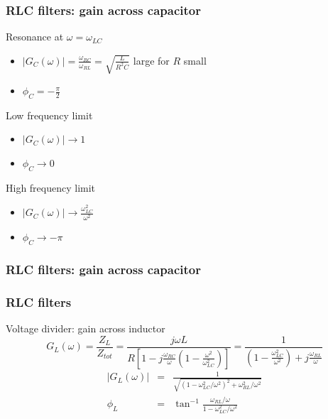 \documentclass[beamer]{standalone}
\begin{document}
\begin{frame}
 \frametitle{RLC filters: gain across capacitor}
 \begin{block}{Resonance at $\omega = \omega_{LC}$}
  \begin{itemize}
   \item $|G_C(\omega)| = \frac{\omega_{RC}}{\omega_{RL}} = \sqrt{\frac{L}{R^2 C}}$ large for $R$ small
   \item $\phi_C = -\frac{\pi}{2}$
  \end{itemize}
 \end{block}
 \begin{block}{Low frequency limit}
  \begin{itemize}
   \item $|G_C(\omega)| \to 1$
   \item $\phi_C \to 0$
  \end{itemize}
 \end{block}
 \begin{block}{High frequency limit}
  \begin{itemize}
   \item $|G_C(\omega)| \to \frac{\omega^2_{LC}}{\omega^2}$
   \item $\phi_C \to -\pi$
  \end{itemize}
 \end{block}
\end{frame}

\begin{frame}
 \frametitle{RLC filters: gain across capacitor}
 \begin{center}
 \end{center}
\end{frame}

\begin{frame}
 \frametitle{RLC filters}
 \begin{block}{Voltage divider: gain across inductor}
  \begin{equation*}
   G_L(\omega) = \frac{Z_L}{Z_{tot}} = \frac{j\omega L}{R\left[ 1 - j\frac{\omega_{RC}}{\omega} \left( 1 - \frac{\omega^2}{\omega_{LC}^2} \right) \right]} = \frac{1}{\left( 1 - \frac{\omega^2_{LC}}{\omega^2} \right) + j\frac{\omega_{RL}}{\omega}}
  \end{equation*}
  \begin{eqnarray*}
   |G_L(\omega)| & = & \frac{1}{\sqrt{ \left(1 - \omega_{LC}^2/\omega^2 \right)^2 + \omega_{RL}^2/\omega^2}} \\
   \phi_L & = & \tan^{-1} \frac{\omega_{RL}/\omega}{1 - \omega_{LC}^2/\omega^2}
  \end{eqnarray*}
 \end{block}
\end{frame}
\end{document}
